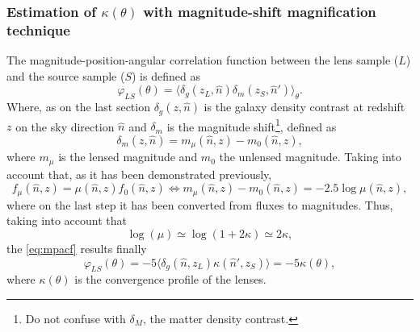 \subsubsection{Estimation of $\kappa(\theta)$ with magnitude-shift magnification technique}
The magnitude-position-angular correlation function between the lens sample ($L$) and the source sample ($S$) is defined as
\begin{equation}
\varphi_{LS}(\theta) = \langle\delta_g(z_L,\hat n)\delta_m(z_S,\hat n')\rangle_\theta.
\label{eq:mpacf}
\end{equation}
Where, as on  the last section $\delta_g (z,\hat n)$ is the galaxy density contrast at redshift $z$ on the sky direction $\hat n$ and $\delta_m$ is the magnitude shift\footnote{Do not confuse with $\delta_M$, the matter density contrast.}, defined as
\begin{equation}
\delta_m(z,\hat n) = m_\mu(\hat n,z)-m_0(\hat n,z),
\end{equation}
where $m_\mu$ is the lensed magnitude and $m_0$ the unlensed magnitude. Taking into account that, as it has been demonstrated previously,
\begin{equation}
f_\mu(\hat n,z) = \mu(\hat n,z)f_0(\hat n,z) \Leftrightarrow m_\mu(\hat n,z)-m_0(\hat n,z) = -2.5\log\mu(\hat n,z),
\end{equation}
where on the last step it has been converted from fluxes to magnitudes. Thus, taking into account that
\begin{equation}
\log(\mu) \simeq \log(1+2\kappa)\simeq 2\kappa,
\end{equation}
the \autoref{eq:mpacf} results finally
\begin{equation}
\varphi_{LS}(\theta)= -5\langle\delta_g(\hat n,z_L)\kappa(\hat n',z_S)\rangle = -5\kappa(\theta),
\end{equation}
where $\kappa(\theta)$ is the convergence profile of the lenses.
\newline

